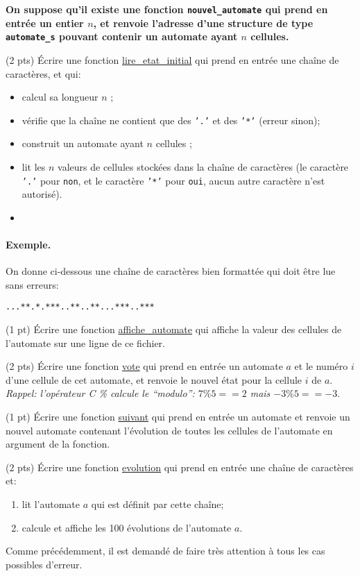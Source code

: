 {\bf On suppose qu'il existe une fonction \texttt{nouvel\_automate}
qui prend en entrée un entier \(n\), et renvoie l'adresse d'une structure
de type \texttt{automate\_s} pouvant contenir un automate ayant \(n\) cellules.


\question (2 pts) {\'E}crire une fonction \url{lire_etat_initial} qui
prend en entr{\'e}e une chaîne de caractères, et qui:
\begin{itemize}
\item calcul sa longueur \(n\) ;
\item vérifie que la chaîne ne contient que des \texttt{'.'}
et des \texttt{'*'} (erreur sinon);
\item construit un automate ayant \(n\) cellules ;
\item lit les $n$ valeurs de cellules stock{\'e}es dans la chaîne de caractères
(le caract{\`e}re \texttt{'.'} pour \texttt{non}, et le caract{\`e}re 
\texttt{'*'} pour \texttt{oui}, aucun autre caract{\`e}re n'est autoris{\'e}).
\item 
\end{itemize}

\paragraph{Exemple.} On donne ci-dessous une chaîne de caractères bien
formatt{\'e}e qui doit {\^e}tre lue sans erreurs:
\begin{verbatim}
...**.*.***..**..**...***..***
\end{verbatim}

\question (1 pt) {\'E}crire une fonction \url{affiche_automate} qui
affiche la valeur des cellules de l'automate sur une ligne de ce fichier.


\question (2 pts) {\'E}crire une fonction \url{vote} qui prend en entr{\'e}e
un automate $a$ et le num{\'e}ro $i$ d'une cellule de cet automate, et
renvoie le nouvel {\'e}tat pour la cellule $i$ de $a$. \textit{Rappel: 
l'op{\'e}rateur C \% calcule le ``modulo'': $7\% 5 == 2$  mais \(-3 \% 5 == -3\)}.


\question (1 pt) {\'E}crire une fonction \url{suivant} qui prend en
entr{\'e}e un automate et renvoie un nouvel automate contenant
l'évolution de toutes les cellules de l'automate en argument de la fonction.


\question (2 pts) {\'E}crire une fonction \url{evolution} qui prend en
entr{\'e}e une chaîne de caractères et:
\begin{enumerate}
\item lit l'automate $a$ qui est d{\'e}finit par cette chaîne;
\item calcule et affiche les 100 {\'e}volutions de l'automate $a$.
\end{enumerate}
Comme pr{\'e}c{\'e}demment, il est demand{\'e} de faire tr{\`e}s
attention {\`a} tous les cas possibles d'erreur.


}
